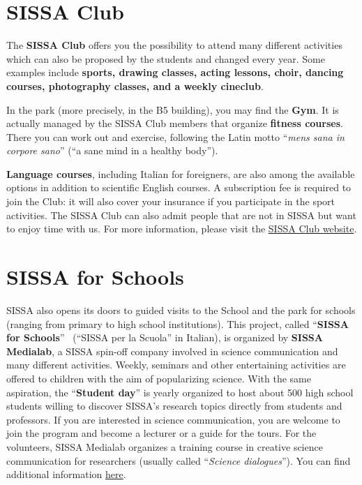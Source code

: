 \documentclass{sissavademecum}
\begin{document}
\section{SISSA Club}

The \textbf{SISSA Club} offers you the possibility to attend many different activities which can also be proposed by the students and changed every year. Some examples include \textbf{sports, drawing classes, acting lessons, choir, dancing courses, photography classes, and a weekly cineclub}. 

In the park (more precisely, in the B5 building), you may find the \textbf{Gym}. It is actually managed by the SISSA Club members that organize \textbf{fitness courses}. There you can work out and exercise, following the Latin motto ``\textit{mens sana in corpore sano}{}'' (``a sane mind in a healthy body''). 

\textbf{Language courses}, including Italian for foreigners, are also among the available options in addition to scientific English courses. A subscription fee is required to join the Club: it will also cover your insurance if you participate in the sport activities. The SISSA Club can also admit people that are not in SISSA but want to enjoy time with us. For more information, please visit the \href{http://club.sissa.it/}{SISSA Club website}. 


\section{SISSA for Schools}

SISSA also opens its doors to guided visits to the School and the park for schools (ranging from primary to high school institutions). This project, called ``\textbf{SISSA for Schools}{}'' \ (``SISSA per la Scuola'' in Italian), is organized by \textbf{SISSA Medialab}, a SISSA spin-off company involved in science communication and many different activities. Weekly, seminars and other entertaining activities are offered to children with the aim of popularizing science. With the same aspiration, the ``\textbf{Student day}'' is yearly organized to host about 500 high school students willing to discover SISSA's research topics directly from students and professors. If you are interested in science communication, you are welcome to join the program and become a lecturer or a guide for the tours.  For the volunteers, SISSA Medialab organizes a training course in creative science communication for researchers (usually called ``\textit{Science dialogues}''). You can find additional information \href{http://medialab.sissa.it/sissaperlascuola/en}{here}.
\end{document}

